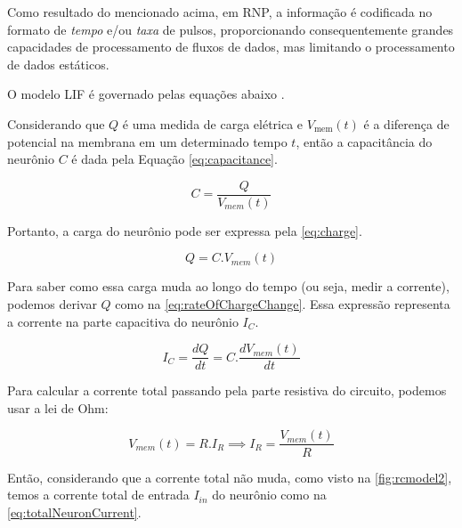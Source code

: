 			\par Como resultado do mencionado acima, em RNP, a informação é codificada no formato de \textit{tempo} e/ou \textit{taxa} de pulsos, proporcionando consequentemente grandes capacidades de processamento de fluxos de dados, mas limitando o processamento de dados estáticos.
			
			\par O modelo LIF é governado pelas equações abaixo \cite{10242251}.
			
			\par Considerando que $Q$ é uma medida de carga elétrica e $V_{\text{mem}}(t)$ é a diferença de potencial na membrana em um determinado tempo $t$, então a capacitância do neurônio $C$ é dada pela Equação \autoref{eq:capacitance}.
			
			\begin{equation}
				\label{eq:capacitance}
				C = \frac{Q}{V_{mem}(t)}
			\end{equation}
			
			\par Portanto, a carga do neurônio pode ser expressa pela \autoref{eq:charge}.
			
			\begin{equation}
				\label{eq:charge}
				Q = C.V_{mem}(t)
			\end{equation}
			
			\par Para saber como essa carga muda ao longo do tempo (ou seja, medir a corrente), podemos derivar $Q$ como na \autoref{eq:rateOfChargeChange}. Essa expressão representa a corrente na parte capacitiva do neurônio $I_C$.
			
			\begin{equation}
				\label{eq:rateOfChargeChange}
				I_C = \dfrac{dQ}{dt} = C. \dfrac{dV_{mem}(t)}{dt}
			\end{equation}
			
			\par Para calcular a corrente total passando pela parte resistiva do circuito, podemos usar a lei de Ohm:
			
			\begin{equation}
				\label{eq:ohmlaw}
				V_{mem}(t) = R.I_R \implies I_R = \frac{V_{mem}(t)}{R}
			\end{equation}
			
			\par Então, considerando que a corrente total não muda, como visto na  \autoref{fig:rcmodel2}, temos a corrente total de entrada $I_{in}$ do neurônio como na \autoref{eq:totalNeuronCurrent}.
			

